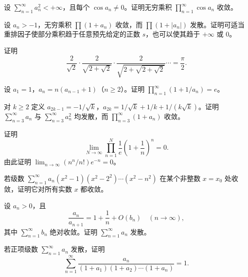\noindent\begin{minipage}{\textwidth}
设 $\sum_{n=1}^{\infty}a_n^2<+\infty$，且每个 $\cos a_n\ne0$。证明无穷乘积 $\prod_{n=1}^{\infty}\cos a_n$ 收敛。
\end{minipage}\par\vfill
\noindent\begin{minipage}{\textwidth}
设 $a_n>-1$，无穷乘积 $\prod(1+a_n)$ 收敛，而 $\prod(1+|a_n|)$ 发散。证明可适当重排因子使部分乘积趋于任意预先给定的正数 $s$，也可以使其趋于 $+\infty$ 或 $0$。
\end{minipage}\par\vfill
\newpage
\noindent\begin{minipage}{\textwidth}
证明\[\frac2{\sqrt2}\cdot\frac2{\sqrt{2+\sqrt2}}\cdot\frac2{\sqrt{2+\sqrt{2+\sqrt2}}}\cdots=\frac\pi2.\]
\end{minipage}\par\vfill
\noindent\begin{minipage}{\textwidth}
设 $a_1=1$，$a_n=n(a_{n-1}+1)$（$n\ge2$）。证明 $\prod_{n=1}^{\infty}(1+1/a_n)=e$。
\end{minipage}\par\vfill
\noindent\begin{minipage}{\textwidth}
对 $k\ge2$ 定义 $a_{2k-1}=-1/\sqrt k$，$a_{2k}=1/\sqrt k+1/k+1/(k\sqrt k)$。证明 $\sum_{n=3}^{\infty}a_n$ 与 $\sum_{n=3}^{\infty}a_n^2$ 均发散，而 $\prod_{n=3}^{\infty}(1+a_n)$ 收敛。
\end{minipage}\par\vfill
\newpage
\noindent\begin{minipage}{\textwidth}
证明\[\lim_{N\to\infty}\prod_{n=1}^N\frac1e\left(1+\frac1n\right)^n=0.\]由此证明 $\lim_{n\to\infty}(n^n/n!)e^{-n}=0$。
\end{minipage}\par\vfill
\noindent\begin{minipage}{\textwidth}
若级数 $\sum_{n=1}^{\infty}a_n(x^2-1)(x^2-2^2)\cdots(x^2-n^2)$ 在某个非整数 $x=x_0$ 处收敛，证明它对所有实数 $x$ 都收敛。
\end{minipage}\par\vfill
\noindent\begin{minipage}{\textwidth}
设 $a_n>0$，且\[\frac{a_n}{a_{n+1}}=1+\frac1n+O(b_n)\quad(n\to\infty),\]其中 $\sum_{n=1}^{\infty}b_n$ 绝对收敛。证明 $\sum_{n=1}^{\infty}a_n$ 发散。
\end{minipage}\par\vfill
\newpage
\noindent\begin{minipage}{\textwidth}
若正项级数 $\sum_{n=1}^{\infty}a_n$ 发散，证明\[\sum_{n=1}^{\infty}\frac{a_n}{(1+a_1)(1+a_2)\cdots(1+a_n)}=1.\]
\end{minipage}\par\vfill
